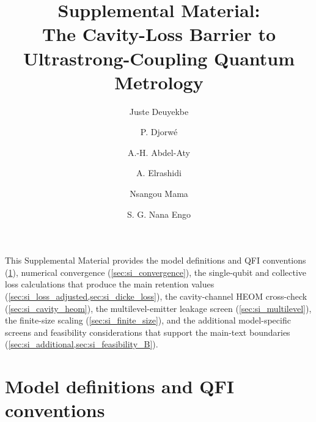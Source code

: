 \documentclass[aps,prxquantum,preprint,superscriptaddress,amsmath,amssymb]{revtex4-2}
\begin{document}
\title{Supplemental Material:\\The Cavity-Loss Barrier to Ultrastrong-Coupling Quantum Metrology}

\author{Juste Deuyekbe}

\author{P. Djorw\'e}

\author{A.-H. Abdel-Aty}

\author{A. Elrashidi}

\author{Nsangou Mama}

\author{S. G. Nana Engo}

\maketitle

\noindent
This Supplemental Material provides the model definitions and QFI conventions (\cref{sec:si_exact_diag}), numerical convergence (\cref{sec:si_convergence}), the single-qubit and collective loss calculations that produce the main retention values (\cref{sec:si_loss_adjusted,sec:si_dicke_loss}), the cavity-channel HEOM cross-check (\cref{sec:si_cavity_heom}), the multilevel-emitter leakage screen (\cref{sec:si_multilevel}), the finite-size scaling (\cref{sec:si_finite_size}), and the additional model-specific screens and feasibility considerations that support the main-text boundaries (\cref{sec:si_additional,sec:si_feasibility_B}).

\section{Model definitions and QFI conventions}
\label{sec:si_exact_diag}
\end{document}
